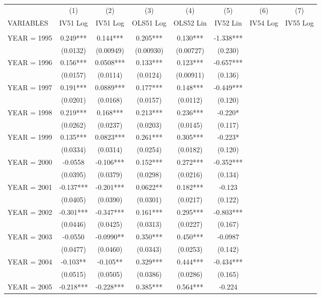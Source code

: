 \begin{tabular}{lccccccc} \hline
 & (1) & (2) & (3) & (4) & (5) & (6) & (7) \\
VARIABLES & IV51 Log & IV51 Log & OLS51 Log & OLS52 Lin & IV52 Lin & IV54 Log & IV55 Log \\ \hline
 &  &  &  &  &  &  &  \\
YEAR = 1995 & 0.249*** & 0.144*** & 0.205*** & 0.130*** & -1.338*** &  &  \\
 & (0.0132) & (0.00949) & (0.00930) & (0.00727) & (0.230) &  &  \\
YEAR = 1996 & 0.156*** & 0.0508*** & 0.133*** & 0.123*** & -0.657*** &  &  \\
 & (0.0157) & (0.0114) & (0.0124) & (0.00911) & (0.136) &  &  \\
YEAR = 1997 & 0.191*** & 0.0889*** & 0.177*** & 0.148*** & -0.449*** &  &  \\
 & (0.0201) & (0.0168) & (0.0157) & (0.0112) & (0.120) &  &  \\
YEAR = 1998 & 0.219*** & 0.168*** & 0.213*** & 0.236*** & -0.220* &  &  \\
 & (0.0262) & (0.0237) & (0.0203) & (0.0145) & (0.117) &  &  \\
YEAR = 1999 & 0.135*** & 0.0823*** & 0.261*** & 0.305*** & -0.223* &  &  \\
 & (0.0334) & (0.0314) & (0.0254) & (0.0182) & (0.120) &  &  \\
YEAR = 2000 & -0.0558 & -0.106*** & 0.152*** & 0.272*** & -0.352*** &  &  \\
 & (0.0395) & (0.0379) & (0.0298) & (0.0216) & (0.134) &  &  \\
YEAR = 2001 & -0.137*** & -0.201*** & 0.0622** & 0.182*** & -0.123 &  &  \\
 & (0.0405) & (0.0390) & (0.0301) & (0.0217) & (0.122) &  &  \\
YEAR = 2002 & -0.301*** & -0.347*** & 0.161*** & 0.295*** & -0.803*** &  &  \\
 & (0.0446) & (0.0425) & (0.0313) & (0.0227) & (0.167) &  &  \\
YEAR = 2003 & -0.0550 & -0.0990** & 0.350*** & 0.450*** & -0.0987 &  &  \\
 & (0.0477) & (0.0460) & (0.0343) & (0.0253) & (0.142) &  &  \\
YEAR = 2004 & -0.103** & -0.105** & 0.329*** & 0.444*** & -0.434*** &  &  \\
 & (0.0515) & (0.0505) & (0.0386) & (0.0286) & (0.165) &  &  \\
YEAR = 2005 & -0.218*** & -0.228*** & 0.385*** & 0.564*** & -0.224 &  &  \\

\end{tabular}
